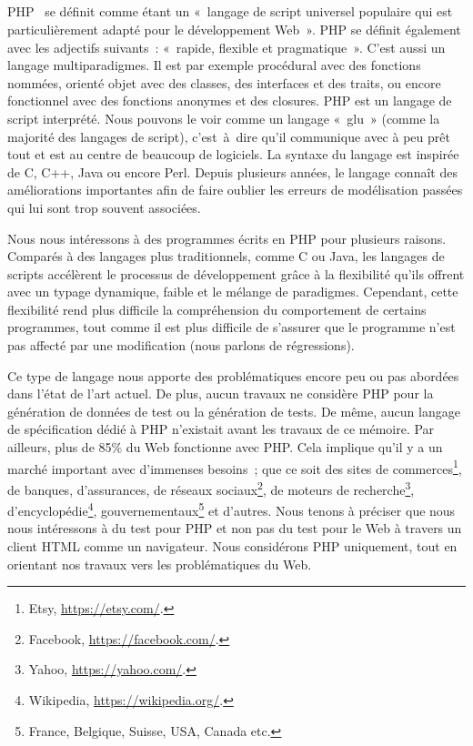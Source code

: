 \subsection{}

PHP~ se définit comme étant un «~langage de script universel
populaire qui est particulièrement adapté pour le développement Web~». PHP se
définit également avec les adjectifs suivants~: «~rapide, flexible et
pragmatique~». C'est aussi un langage multiparadigmes. Il est par exemple
procédural avec des fonctions nommées, orienté objet avec des classes, des
interfaces et des traits, ou encore fonctionnel avec des fonctions anonymes et
des closures. PHP est un langage de script interprété. Nous pouvons le voir
comme un langage «~glu~» (comme la majorité des langages de script),
c'est~à~dire qu'il communique avec à peu prêt tout et est au centre de beaucoup
de logiciels. La syntaxe du langage est inspirée de C, C++, Java ou encore Perl.
Depuis plusieurs années, le langage connaît des améliorations importantes afin
de faire oublier les erreurs de modélisation passées qui lui sont trop souvent
associées.

Nous nous intéressons à des programmes écrits en PHP pour plusieurs raisons.
Comparés à des langages plus traditionnels, comme C ou Java, les langages de
scripts accélèrent le processus de développement grâce à la flexibilité qu'ils
offrent avec un typage dynamique, faible et le mélange de paradigmes. Cependant,
cette flexibilité rend plus difficile la compréhension du comportement de
certains programmes, tout comme il est plus difficile de s'assurer que le
programme n'est pas affecté par une modification (nous parlons de {\strong
régressions}).

Ce type de langage nous apporte des problématiques encore peu ou pas abordées
dans l'état de l'art actuel. De plus, aucun travaux ne considère PHP pour la
génération de données de test ou la génération de tests. De même, aucun langage
de spécification dédié à PHP n'existait avant les travaux de ce mémoire. Par
ailleurs, plus de 85\% du Web fonctionne avec PHP.  Cela implique qu'il y a un
marché important avec d'immenses besoins~; que ce soit des sites de
commerces\footnote{Etsy, \url{https://etsy.com/}.}, de banques, d'assurances, de
réseaux sociaux\footnote{Facebook, \url{https://facebook.com/}.}, de moteurs de
recherche\footnote{Yahoo, \url{https://yahoo.com/}.},
d'encyclopédie\footnote{Wikipedia, \url{https://wikipedia.org/}.},
gouvernementaux\footnote{France, Belgique, Suisse, USA, Canada etc.} et
d'autres. Nous tenons à préciser que nous nous intéressons à du test pour PHP et
non pas du test pour le Web à travers un client HTML comme un navigateur. Nous
considérons PHP uniquement, tout en orientant nos travaux vers les
problématiques du Web.

